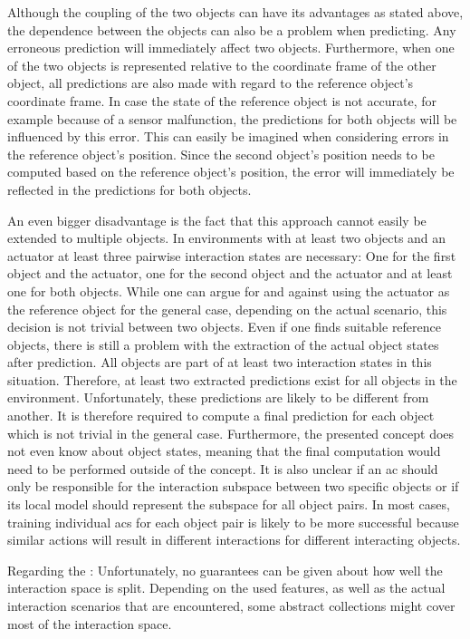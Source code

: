 Although the coupling of the two objects can have its advantages as stated above, the dependence between the objects can also be a problem when predicting. Any erroneous prediction will immediately affect two objects. 
Furthermore, when one of the two objects is represented relative to the coordinate frame of the other object, all predictions are also made with regard to the reference object's coordinate frame. 
In case the state of the reference object is not accurate, for example because of a sensor malfunction, the predictions for both objects will be influenced by this error.
This can easily be imagined when considering errors in the reference object's position. Since the second object's position needs to be computed based on the reference object's position, the error will immediately be reflected in the predictions for both objects.

An even bigger disadvantage is the fact that this approach cannot easily be extended to multiple objects. In environments with at least two objects and an actuator at least three pairwise interaction states are necessary: One for the first object and the actuator, one for the second object and the actuator and at least one for both objects. 
While one can argue for and against using the actuator as the reference object for the general case, depending on the actual scenario, this decision is not trivial between two objects. 
Even if one finds suitable reference objects, there is still a problem with the extraction of the actual object states after prediction. All objects are part of at least two interaction states in this situation. Therefore, at least two extracted predictions exist for all objects in the environment. Unfortunately, these predictions are likely to be different from another. It is therefore required to compute a final prediction for each object which is not trivial in the general case. Furthermore, the presented concept does not even know about object states, meaning that the final computation would need to be performed outside of the concept.
It is also unclear if an \gls{ac} should only be responsible for the interaction subspace between two specific objects or if its local model should represent the subspace for all object pairs. In most cases, training individual \glspl{ac} for each object pair is likely to be more successful because similar actions will result in different interactions for different interacting objects.

Regarding the : 
Unfortunately, no guarantees can be given about how well the interaction space is split. Depending on the used features, as well as the actual interaction scenarios that are encountered, some abstract collections might cover most of the interaction space. 


